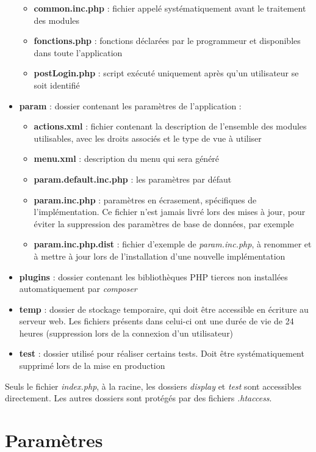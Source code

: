 \begin{itemize}
\begin{itemize}
\item \textbf{common.inc.php} : fichier appelé systématiquement avant le traitement des modules
\item \textbf{fonctions.php} : fonctions déclarées par le programmeur et disponibles dans toute l'application 
\item \textbf{postLogin.php} : script exécuté uniquement après qu'un utilisateur se soit identifié
\end{itemize}
\item \textbf{param} : dossier contenant les paramètres de l'application :
\begin{itemize}
\item \textbf{actions.xml} : fichier contenant la description de l'ensemble des modules utilisables, avec les droits associés et le type de vue à utiliser
\item \textbf{menu.xml} : description du menu qui sera généré
\item \textbf{param.default.inc.php} : les paramètres par défaut
\item \textbf{param.inc.php} : paramètres en écrasement, spécifiques de l'implémentation. Ce fichier n'est jamais livré lors des mises à jour, pour éviter la suppression des paramètres de base de données, par exemple
\item \textbf{param.inc.php.dist} : fichier d'exemple de \textit{param.inc.php}, à renommer et à mettre à jour lors de l'installation d'une nouvelle implémentation
\end{itemize}
\item \textbf{plugins} : dossier contenant les bibliothèques PHP tierces non installées automatiquement par \textit{composer}
\item \textbf{temp} : dossier de stockage temporaire, qui doit être accessible en écriture au serveur web. Les fichiers présents dans celui-ci ont une durée de vie de 24 heures (suppression lors de la connexion d'un utilisateur)
\item \textbf{test} : dossier utilisé pour réaliser certains tests. Doit être systématiquement supprimé lors de la mise en production
\end{itemize}

Seuls le fichier \textit{index.php}, à la racine, les dossiers \textit{display} et \textit{test} sont accessibles directement. Les autres dossiers sont protégés par des fichiers \textit{.htaccess}.

\section{Paramètres}\label{param}


